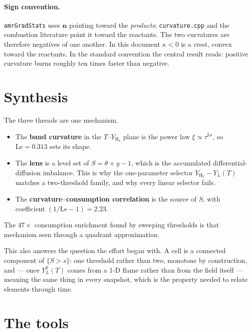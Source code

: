 \documentclass[11pt]{article}
\newcommand{\YH}{Y_{\mathrm{H_2}}}
\newcommand{\Le}{\mathrm{Le}}
\begin{document}
\paragraph{Sign convention.} \texttt{amrGradStats} uses $\mathbf{n}$ pointing
toward the \emph{products}; \texttt{curvature.cpp} and the combustion
literature point it toward the reactants. The two curvatures are therefore
negatives of one another. In this document $\kappa < 0$ is a crest, convex
toward the reactants. In the standard convention the central result reads:
positive curvature burns roughly ten times faster than negative.

\section{Synthesis}
\label{sec:synthesis}

The three threads are one mechanism.

\begin{itemize}
\item The \textbf{band curvature} in the $T$--$\YH$ plane is the power law
      $\xi \propto \tau^{\Le}$, so $\Le = 0.313$ sets its shape.
\item The \textbf{lens} is a level set of $S = \theta + y - 1$, which is the
      accumulated differential-diffusion imbalance. This is why the
      one-parameter selector $\YH - Y_L(T)$ matches a two-threshold family,
      and why every linear selector fails.
\item The \textbf{curvature--consumption correlation} is the source of $S$,
      with coefficient $(1/\Le - 1) = 2.23$.
\end{itemize}

The $47\times$ consumption enrichment found by sweeping thresholds is that
mechanism seen through a quadrant approximation.

This also answers the question the effort began with. A cell is a connected
component of $\{S > s\}$: one threshold rather than two, monotone by
construction, and --- once $Y_L^0(T)$ comes from a 1-D flame rather than from
the field itself --- meaning the same thing in every snapshot, which is the
property needed to relate elements through time.

\section{The tools}
\label{sec:tools}
\end{document}
